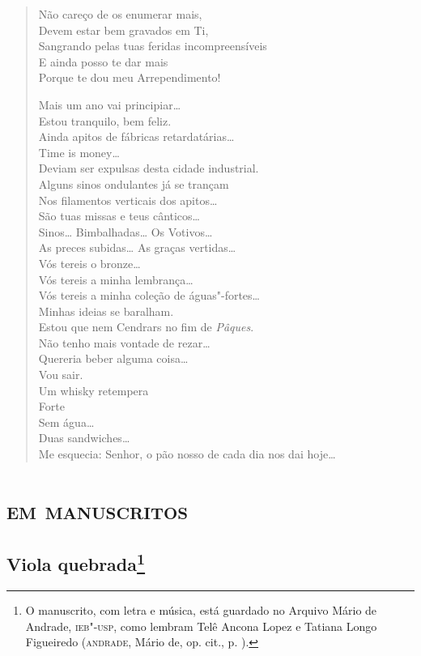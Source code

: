 \begin{verse}
Não careço de os enumerar mais,\\
Devem estar bem gravados em Ti,\\
Sangrando pelas tuas feridas incompreensíveis\\
E ainda posso te dar mais\\
Porque te dou meu Arrependimento!

Mais um ano vai principiar\ldots{}\\
Estou tranquilo, bem feliz.\\
Ainda apitos de fábricas retardatárias\ldots{}\\
\qquad\qquad\qquad\qquad\quad Time is money\ldots{}\\
\qquad Deviam ser expulsas desta cidade industrial.\\
Alguns sinos ondulantes já se trançam\\
Nos filamentos verticais dos apitos\ldots{}\\
São tuas missas e teus cânticos\ldots{}\\
Sinos\ldots{} Bimbalhadas\ldots{} Os Votivos\ldots{}\\
As preces subidas\ldots{} As graças vertidas\ldots{}\\
Vós tereis o bronze\ldots{}\\
\qquad Vós tereis a minha lembrança\ldots{}\\
\qquad\qquad Vós tereis a minha coleção de águas"-fortes\ldots{}\\
Minhas ideias se baralham.\\
Estou que nem Cendrars no fim de \emph{Pâques}.\\
Não tenho mais vontade de rezar\ldots{}\\
Quereria beber alguma coisa\ldots{}\\
Vou sair.\\
Um whisky retempera\\
\qquad Forte\\
\qquad Sem água\ldots{}\\
Duas sandwiches\ldots{}\\
Me esquecia: Senhor, o pão nosso de cada dia nos dai hoje\ldots{}
\end{verse}

\movetoevenpage
{}
\part*{\textsc{em manuscritos}}

\chapter{Viola quebrada\footnote[*]{O manuscrito, com letra e música, está
  guardado no Arquivo Mário de Andrade, \textsc{ieb"-usp}, como lembram Telê
  Ancona Lopez e Tatiana Longo Figueiredo (\textsc{andrade}, Mário de, op. cit.,
  p. ).}}

